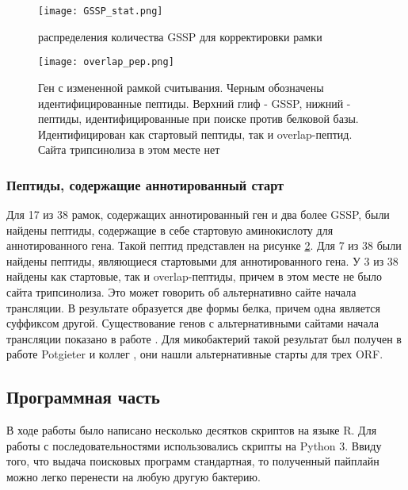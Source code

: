 \begin{figure}[h!]
    \begin{center}
        \texttt{[image: GSSP\_stat.png]}
    \end{center}
\caption[foo bar]{распределения количества GSSP для корректировки рамки}
\label{GSSP_stat}
\end{figure}

\begin{figure}[h!]
    \begin{center}
        \texttt{[image: overlap\_pep.png]}
    \end{center}
\caption[foo bar]{Ген с измененной рамкой считывания. Черным обозначены идентифицированные пептиды. Верхний глиф - GSSP, нижний - пептиды, идентифицированные при поиске против белковой базы. Идентифицирован как стартовый пептиды, так и overlap-пептид. Сайта трипсинолиза в этом месте нет}
\label{overlap_pep}
\end{figure}



\subsubsection{Пептиды, содержащие аннотированный старт}
Для 17 из 38 рамок, содержащих аннотированный ген и два более GSSP, были найдены пептиды, содержащие в себе стартовую аминокислоту для аннотированного гена. Такой пептид представлен на рисунке \ref{overlap_pep}. Для 7 из 38 были найдены пептиды, являющиеся стартовыми для аннотированного гена. У 3 из 38 найдены как стартовые, так и overlap-пептиды, причем в этом месте не было сайта трипсинолиза. Это может говорить об альтернативно сайте начала трансляции. В результате образуется две формы белка, причем одна является суффиксом другой. Существование генов с альтернативными сайтами начала трансляции показано в работе \cite{packham1997mammalian}. Для микобактерий такой результат был получен в работе Potgieter и коллег \cite{potgieter2016proteogenomic}, они нашли альтернативные старты для трех ORF.

\subsection{Программная часть}
В ходе работы было написано несколько десятков скриптов на языке R. Для работы с последовательностями использовались скрипты на Python 3. Ввиду того, что выдача поисковых программ стандартная, то полученный пайплайн можно легко перенести на любую другую бактерию. 
\newpage


